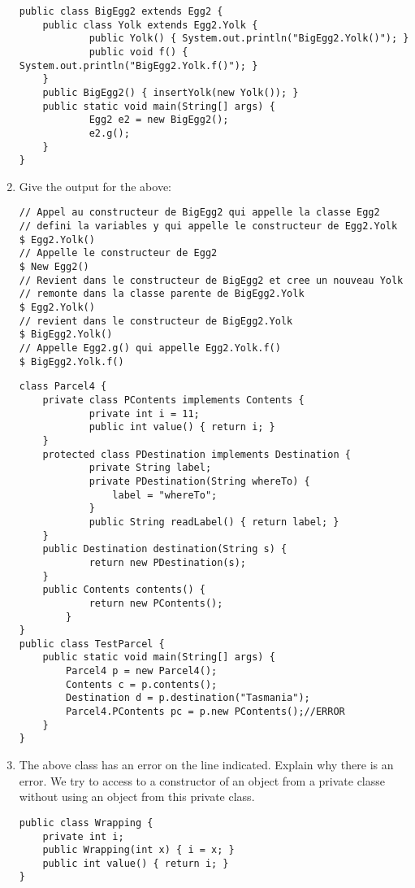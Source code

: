 \documentclass{article}
\begin{document}
\begin{enumerate}
\begin{lstlisting}
public class BigEgg2 extends Egg2 {
  	public class Yolk extends Egg2.Yolk {
    		public Yolk() { System.out.println("BigEgg2.Yolk()"); }
    		public void f() { System.out.println("BigEgg2.Yolk.f()"); }
  	}
  	public BigEgg2() { insertYolk(new Yolk()); }
  	public static void main(String[] args) {
    		Egg2 e2 = new BigEgg2();
    		e2.g();
  	}
}
\end{lstlisting}
	\item Give the output for the above:
\begin{lstlisting}
// Appel au constructeur de BigEgg2 qui appelle la classe Egg2
// defini la variables y qui appelle le constructeur de Egg2.Yolk
$ Egg2.Yolk()
// Appelle le constructeur de Egg2
$ New Egg2()
// Revient dans le constructeur de BigEgg2 et cree un nouveau Yolk
// remonte dans la classe parente de BigEgg2.Yolk
$ Egg2.Yolk()
// revient dans le constructeur de BigEgg2.Yolk
$ BigEgg2.Yolk()
// Appelle Egg2.g() qui appelle Egg2.Yolk.f()
$ BigEgg2.Yolk.f()
\end{lstlisting}
	\newpage
	
\begin{lstlisting}
class Parcel4 {
  	private class PContents implements Contents {
    		private int i = 11;
    		public int value() { return i; }
  	}
  	protected class PDestination implements Destination {
    		private String label;
    		private PDestination(String whereTo) {
      			label = "whereTo";
    		}
    		public String readLabel() { return label; }
  	}
  	public Destination destination(String s) {
    		return new PDestination(s);
  	}
  	public Contents contents() {
    		return new PContents();
    	}
}
public class TestParcel {
	public static void main(String[] args) {
		Parcel4 p = new Parcel4();
		Contents c = p.contents();
		Destination d = p.destination("Tasmania");
		Parcel4.PContents pc = p.new PContents();//ERROR
  	}
}
\end{lstlisting}
	\item The above class has an error on the line indicated. Explain why there is an error.\newline
	We try to access to a constructor of an object from a private classe without using an object from this private class.
	\newpage
	
\begin{lstlisting}
public class Wrapping {
  	private int i;
  	public Wrapping(int x) { i = x; }
  	public int value() { return i; }
}


\end{lstlisting}
\end{enumerate}
\end{document}
